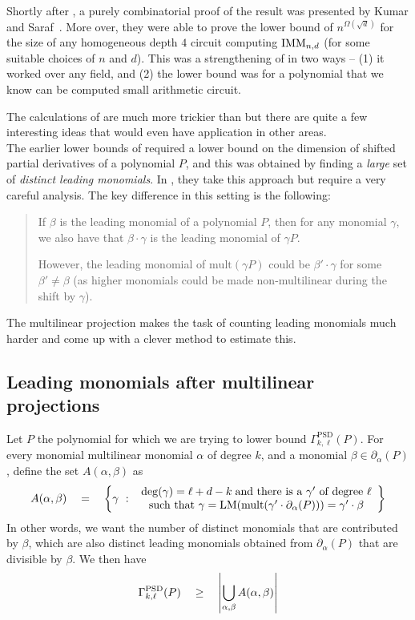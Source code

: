Shortly after \cite{KLSS}, a purely combinatorial proof of the result was presented by Kumar and Saraf~\cite{KS14}. 
More over, they were able to prove the lower bound of $n^{\Omega(\sqrt{d})}$ for the size of any homogeneous depth $4$ circuit computing $\mathrm{IMM}_{n,d}$ (for some suitable choices of $n$ and $d$). 
This was a strengthening of \cite{KLSS} in two ways -- (1) it worked over any field, and (2) the lower bound was for a polynomial that we know can be computed small arithmetic circuit. 

The calculations of \cite{KS14} are much more trickier than \cite{KLSS} but there are quite a few interesting ideas that would even have application in other areas. \\

The earlier lower bounds of \cite{gkks13,KSS13,FLMS13} required a lower bound on the dimension of shifted partial derivatives of a polynomial $P$, and this was obtained by finding a \emph{large} set of \emph{distinct leading monomials}. 
In \cite{KS14}, they take this approach but require a very careful analysis. 
The key difference in this setting is the following: 

\begin{quote}
  If $\beta$ is the leading monomial of a polynomial $P$, then for any monomial $\gamma$, we also have that $\beta \cdot \gamma$ is the leading monomial of $\gamma P$. 

  However, the leading monomial of $\mathrm{mult}(\gamma P)$ could be $\beta' \cdot \gamma$ for some $\beta' \neq \beta$ (as higher monomials could be made non-multilinear during the shift by $\gamma$). 
\end{quote}

The multilinear projection makes the task of counting leading monomials much harder and \cite{KS14} come up with a clever method to estimate this. 

\subsection*{Leading monomials after multilinear projections}

Let $P$ the polynomial for which we are trying to lower bound $\Gamma^{\mathrm{PSD}}_{k,\ell}(P)$. 
For every monomial multilinear monomial $\alpha$ of degree $k$, and a monomial $\beta \in \partial_\alpha(P)$, define the set $A(\alpha, \beta)$ as
\[
A(\alpha, \beta) \quad = \quad \left\{{\gamma}\ : \ {\begin{array}{c}\deg(\gamma) = \ell + d - k\;\text{and there is a $\gamma'$ of degree $\ell$}\\\text{such that }\gamma  = \mathrm{LM}(\mathrm{mult}(\gamma' \cdot \partial_\alpha(P))) = \gamma' \cdot \beta \end{array}}\right\}
\]
In other words, we want the number of distinct monomials that are contributed by $\beta$, which are also distinct leading monomials obtained from $\partial_\alpha(P)$ that are divisible by $\beta$. 
We then have
\begin{equation}\label{eqn:union-of-As}
\Gamma^{\mathrm{PSD}}_{k,\ell}(P) \quad \geq \quad \left|\bigcup_{\alpha, \beta} A(\alpha, \beta)\right|
\end{equation}

